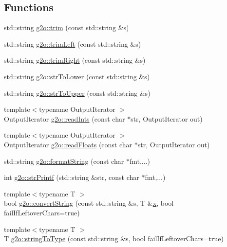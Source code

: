 \subsection*{Functions}
\begin{DoxyCompactItemize}
\item 
std\+::string \hyperlink{group__utils_ga5c3812993227cfbec772c7477928c1fc}{g2o\+::trim} (const std\+::string \&s)
\item 
std\+::string \hyperlink{group__utils_ga1e3dc946d073cacb02cf458d67471ad5}{g2o\+::trim\+Left} (const std\+::string \&s)
\item 
std\+::string \hyperlink{group__utils_ga3e3eb912f0f9e272e81127f1653edf38}{g2o\+::trim\+Right} (const std\+::string \&s)
\item 
std\+::string \hyperlink{group__utils_ga98a43706466c9618576a0f23e9021457}{g2o\+::str\+To\+Lower} (const std\+::string \&s)
\item 
std\+::string \hyperlink{group__utils_gac5545be3a953651c68fe8c81313f2564}{g2o\+::str\+To\+Upper} (const std\+::string \&s)
\item 
{\footnotesize template$<$typename Output\+Iterator $>$ }\\Output\+Iterator \hyperlink{group__utils_gae501003a8f6b60afb846857fdb82174d}{g2o\+::read\+Ints} (const char $\ast$str, Output\+Iterator out)
\item 
{\footnotesize template$<$typename Output\+Iterator $>$ }\\Output\+Iterator \hyperlink{group__utils_ga88353c6cfc2e519df07814ca577e71ec}{g2o\+::read\+Floats} (const char $\ast$str, Output\+Iterator out)
\item 
std\+::string \hyperlink{group__utils_ga948eee11520b4508727e2020b36faa48}{g2o\+::format\+String} (const char $\ast$fmt,...)
\item 
int \hyperlink{group__utils_gad6042db9246017195692a73ec62abc5f}{g2o\+::str\+Printf} (std\+::string \&str, const char $\ast$fmt,...)
\item 
{\footnotesize template$<$typename T $>$ }\\bool \hyperlink{group__utils_ga599c46f6984e9a2147fac39324e9fadc}{g2o\+::convert\+String} (const std\+::string \&s, T \&\hyperlink{sparse__helper_8cpp_af88b946fb90d5f08b5fb740c70e98c10}{x}, bool fail\+If\+Leftover\+Chars=true)
\item 
{\footnotesize template$<$typename T $>$ }\\T \hyperlink{group__utils_ga9dac39a213d269b8d68fb698bf82873a}{g2o\+::string\+To\+Type} (const std\+::string \&s, bool fail\+If\+Leftover\+Chars=true)

\end{DoxyCompactItemize}
